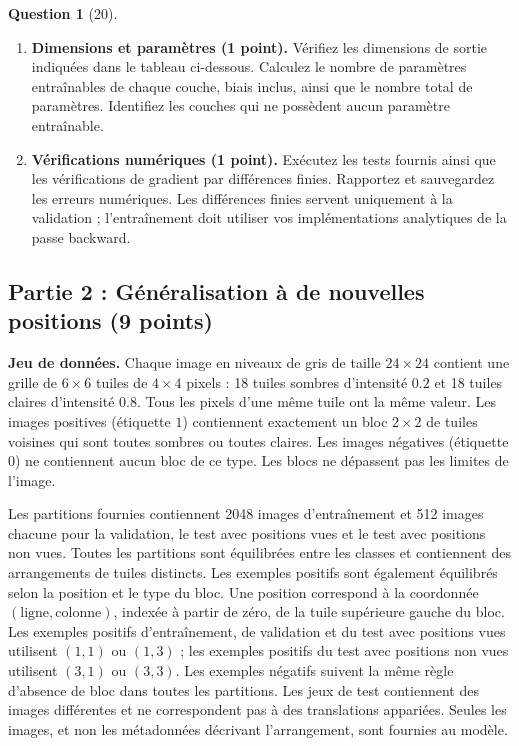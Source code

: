 \documentclass[12pt]{article}
\theoremstyle{definition}
\newtheorem{exercise}{Question}
\begin{document}
\begin{exercise}[20]
{\begin{enumerate}[label=\textbf{2.1.\arabic*}, leftmargin=*]
    \item \textbf{Dimensions et paramètres (1 point).}
    Vérifiez les dimensions de sortie indiquées dans le tableau
    ci-dessous. Calculez le nombre de paramètres entraînables de chaque
    couche, biais inclus, ainsi que le nombre total de paramètres.
    Identifiez les couches qui ne possèdent aucun paramètre entraînable.

    \item \textbf{Vérifications numériques (1 point).}
    Exécutez les tests fournis ainsi que les vérifications de gradient
    par différences finies. Rapportez et sauvegardez les erreurs
    numériques. Les différences finies servent uniquement à la
    validation ; l'entraînement doit utiliser vos implémentations
    analytiques de la passe backward.
\end{enumerate}

\subsection*{Partie 2 : Généralisation à de nouvelles positions (9 points)}

\textbf{Jeu de données.}
Chaque image en niveaux de gris de taille $24\times24$ contient une
grille de $6\times6$ tuiles de $4\times4$ pixels : 18 tuiles sombres
d'intensité $0.2$ et 18 tuiles claires d'intensité $0.8$. Tous les
pixels d'une même tuile ont la même valeur.
Les images positives (étiquette $1$) contiennent exactement un bloc
$2\times2$ de tuiles voisines qui sont toutes sombres ou toutes
claires. Les images négatives (étiquette $0$) ne contiennent aucun
bloc de ce type. Les blocs ne dépassent pas les limites de l'image.

Les partitions fournies contiennent 2048 images d'entraînement et
512 images chacune pour la validation, le test avec positions vues
et le test avec positions non vues.
Toutes les partitions sont équilibrées entre les classes et contiennent
des arrangements de tuiles distincts.
Les exemples positifs sont également équilibrés selon la position et
le type du bloc.
Une position correspond à la coordonnée
$(\mathrm{ligne},\mathrm{colonne})$, indexée à partir de zéro, de la
tuile supérieure gauche du bloc. Les exemples positifs d'entraînement,
de validation et du test avec positions vues utilisent $(1,1)$ ou
$(1,3)$ ; les exemples positifs du test avec positions non vues
utilisent $(3,1)$ ou $(3,3)$. Les exemples négatifs suivent la même
règle d'absence de bloc dans toutes les partitions. Les jeux de test
contiennent des images différentes et ne correspondent pas à des
translations appariées.
Seules les images, et non les métadonnées décrivant l'arrangement,
sont fournies au modèle.


}
\end{exercise}
\end{document}
